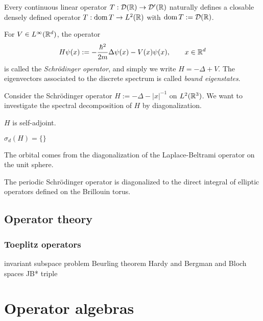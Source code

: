\documentclass{../../large}
\begin{document}
\begin{prb}
\begin{parts}
\item Every continuous linear operator $T:\mathcal{D}(\mathbb{R})\to\mathcal{D}'(\mathbb{R})$ naturally defines a closable densely defined operator $T:\operatorname{dom} T\to L^2(\mathbb{R})$ with $\operatorname{dom} T:=\mathcal{D}(\mathbb{R})$.
\end{parts}
\end{prb}

\begin{prb}
For $V\in L^\infty(\mathbb{R}^d)$, the operator
\[H\psi(x):=-\frac{\hbar^2}{2m}\Delta\psi(x)-V(x)\psi(x),\qquad x\in\mathbb{R}^d\]
is called the \emph{Schr\"odinger operator}, and simply we write $H=-\Delta+V$.
The eigenvectors associated to the discrete spectrum is called \emph{bound eigenstates}.

Consider the Schr\"odinger operator $H:=-\Delta-|x|^{-1}$ on $L^2(\mathbb{R}^3)$.
We want to investigate the spectral decomposition of $H$ by diagonalization.
\begin{parts}
\item $H$ is self-adjoint.
\item $\sigma_d(H)=\{\}$
\end{parts}
\end{prb}

The orbital comes from the diagonalization of the Laplace-Beltrami operator on the unit sphere.

The periodic Schr\"odinger operator is diagonalized to the direct integral of elliptic operators defined on the Brillouin torus.



\chapter{Operator theory}
\section{Toeplitz operators}

invariant subspace problem
Beurling theorem
Hardy and Bergman and Bloch spaces
JB* triple


\chapter{}




\part{Operator algebras}
\end{document}

